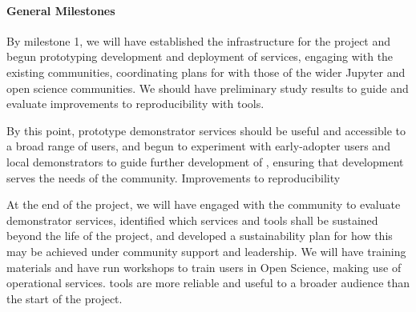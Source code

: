 
\milestonetable



\paragraph{General Milestones}

\begin{milestones}
  {
  By milestone 1, we will have established the infrastructure
  for the project and begun prototyping development and deployment of services,
  engaging with the existing communities,
  coordinating plans for \TheProject with those of the wider Jupyter and open science communities.
  We should have preliminary study results to guide and evaluate improvements to reproducibility
  with \TheProject tools.
  }

  {
  By this point, prototype demonstrator services should be useful and accessible
  to a broad range of users, and begun to experiment with early-adopter
  users and local demonstrators to guide further development of \TheProject,
  ensuring that development serves the needs of the community.
  Improvements to reproducibility
  }

  {
  At the end of the project,
  we will have engaged with the community to evaluate demonstrator services,
  identified which services and tools shall be sustained beyond the life of the project,
  and developed a sustainability plan for how this may be achieved under community support and leadership.
  We will have training materials and have run workshops to train users in Open Science,
  making use of operational \TheProject services.
  \TheProject tools are more reliable and useful to a broader audience than the start of the project.
  }


\end{milestones}
